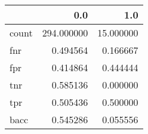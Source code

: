 \begin{tabular}{lrr}
\toprule
{} &         0.0 &        1.0 \\
\midrule
count &  294.000000 &  15.000000 \\
fnr   &    0.494564 &   0.166667 \\
fpr   &    0.414864 &   0.444444 \\
tnr   &    0.585136 &   0.000000 \\
tpr   &    0.505436 &   0.500000 \\
bacc  &    0.545286 &   0.055556 \\
\bottomrule
\end{tabular}
